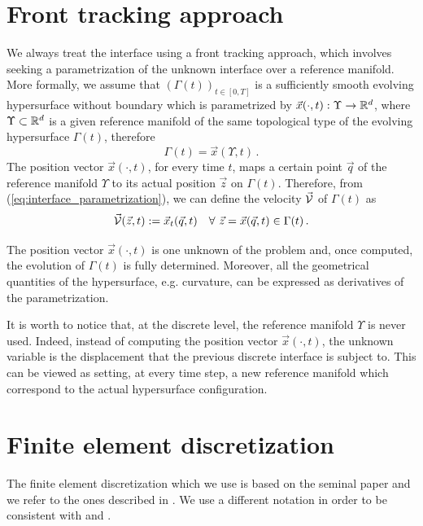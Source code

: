 \section{Front tracking approach}\label{sec:front_tracking_approach}
We always treat the interface using a front tracking approach, which involves
seeking a parametrization of the unknown interface over a reference manifold.
More formally, we assume that $(\Gamma(t))_{t\in [0,T]}$ is a sufficiently
smooth evolving hypersurface without boundary which is parametrized by
$\vec x(\cdot,t):\Upsilon\to{\mathbb R}^d$, where $\Upsilon\subset {\mathbb R}^d$ is a given
reference manifold of the same topological type of the evolving hypersurface
$\Gamma(t)$, therefore
\begin{equation}\label{eq:interface_parametrization}
\Gamma(t) = \vec x(\Upsilon,t)\,.
\end{equation}
The position vector $\vec x(\cdot,t)$, for every time $t$, maps a certain point
$\vec{q}$ of the reference manifold $\Upsilon$ to its actual position
$\vec{z}$ on $\Gamma(t)$. Therefore, from (\ref{eq:interface_parametrization}),
we can define the velocity $\vec{\mathcal{V}}$ of $\Gamma(t)$ as
\begin{equation} \label{eq:V}
\vec{\mathcal{V}}(\vec z, t) := \vec x_t(\vec q, t) \quad
\forall\ \vec z = \vec x(\vec q,t) \in \Gamma(t)\,.
\end{equation}

The position vector $\vec x(\cdot,t)$ is one unknown of the problem and, once
computed, the evolution of $\Gamma(t)$ is fully determined. Moreover, all the
geometrical quantities of the hypersurface, e.g. curvature, can be expressed as
derivatives of the parametrization.

It is worth to notice that, at the discrete level, the reference manifold
$\Upsilon$ is never used. Indeed, instead of computing the position vector
$\vec x(\cdot,t)$, the unknown variable is the displacement that the previous
discrete interface is subject to. This can be viewed as setting, at every time
step, a new reference manifold which correspond to the actual hypersurface
configuration.

\section{Finite element discretization}\label{sec:geometric_pdes_fem}
The finite element discretization which we use is based on the seminal paper
\cite{Dziuk91} and we refer to the ones described in
\cite{triplejMC,triplej,gflows3d}. We use a different notation in order to be
consistent with \cite{spurious} and \cite{stokesfitted}.

